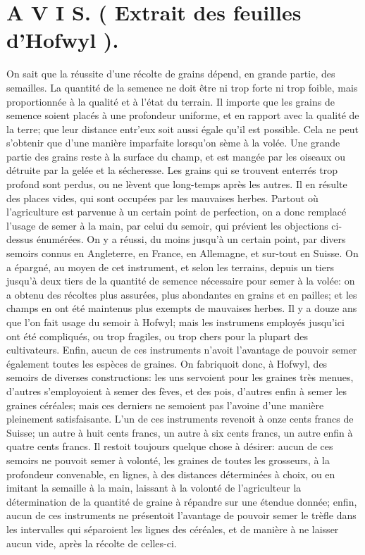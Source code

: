 \setcounter{page}{112}
\section{A V I S. \large{( Extrait des feuilles d'Hofwyl ).}}
On sait que la réussite d'une récolte de grains dépend, en grande partie, des semailles. La quantité de la semence ne doit être ni trop forte ni trop foible, mais proportionnée à la qualité et à l'état du terrain. Il importe que les grains de semence\setcounter{page}{113} soient placés à une profondeur uniforme, et en rapport avec la qualité de la terre; que leur distance entr'eux soit aussi égale qu'il est possible. Cela ne peut s'obtenir que d'une manière imparfaite lorsqu'on sème à la volée. Une grande partie des grains reste à la surface du champ, et est mangée par les oiseaux ou détruite par la gelée et la sécheresse. Les grains qui se trouvent enterrés trop profond sont perdus, ou ne lèvent que long-temps après les autres. Il en résulte des places vides, qui sont occupées par les mauvaises herbes.
Partout où l'agriculture est parvenue à un certain point de perfection, on a donc remplacé l'usage de semer à la main, par celui du semoir, qui prévient les objections ci-dessus énumérées. On y a réussi, du moins jusqu'à un certain point, par divers semoirs connus en Angleterre, en France, en Allemagne, et sur-tout en Suisse. On a épargné, au moyen de cet instrument, et selon les terrains, depuis un tiers jusqu'à deux tiers de la quantité de semence nécessaire pour semer à la volée: on a obtenu des récoltes plus assurées, plus abondantes en grains et en pailles; et les champs en ont été maintenus plus exempts de mauvaises herbes.
Il y a douze ans que l'on fait usage du semoir à Hofwyl; mais les instrumens employés\setcounter{page}{114} jusqu'ici ont été compliqués, ou trop fragiles, ou trop chers pour la plupart des cultivateurs. Enfin, aucun de ces instruments n'avoit l'avantage de pouvoir semer également toutes les espèces de graines. On fabriquoit donc, à Hofwyl, des semoirs de diverses constructions: les uns servoient pour les graines très menues, d'autres s'employoient à semer des fèves, et des pois, d'autres enfin à semer les graines céréales; mais ces derniers ne semoient pas l'avoine d'une manière pleinement satisfaisante. L'un de ces instruments revenoit à onze cents francs de Suisse; un autre à huit cents francs, un autre à six cents francs, un autre enfin à quatre cents francs. Il restoit toujours quelque chose à désirer: aucun de ces semoirs ne pouvoit semer à volonté, les graines de toutes les grosseurs, à la profondeur convenable, en lignes, à des distances déterminées à choix, ou en imitant la semaille à la main, laissant à la volonté de l'agriculteur la détermination de la quantité de graine à répandre sur une étendue donnée; enfin, aucun de ces instruments ne présentoit l'avantage de pouvoir semer le trèfle dans les intervalles qui séparoient les lignes des céréales, et de manière à ne laisser aucun vide, après la récolte de celles-ci.
